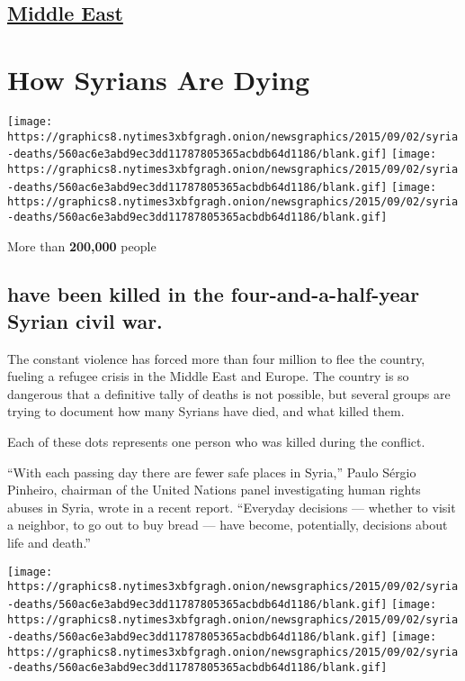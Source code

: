 \hypertarget{-middle-east-}{%
\subsection{\texorpdfstring{ \href{/section/world/middleeast}{Middle
East} }{ Middle East }}\label{-middle-east-}}

\hypertarget{how-syrians-are-dying}{%
\section{How Syrians Are Dying}\label{how-syrians-are-dying}}

\texttt{[image: https://graphics8.nytimes3xbfgragh.onion/newsgraphics/2015/09/02/syria-deaths/560ac6e3abd9ec3dd11787805365acbdb64d1186/blank.gif]}
\texttt{[image: https://graphics8.nytimes3xbfgragh.onion/newsgraphics/2015/09/02/syria-deaths/560ac6e3abd9ec3dd11787805365acbdb64d1186/blank.gif]}
\texttt{[image: https://graphics8.nytimes3xbfgragh.onion/newsgraphics/2015/09/02/syria-deaths/560ac6e3abd9ec3dd11787805365acbdb64d1186/blank.gif]}

More than \textbf{200,000} people

\hypertarget{have-been-killed-in-the-four-and-a-half-year-syrian-civil-war}{%
\subsection{have been killed in the four-and-a-half-year Syrian civil
war.}\label{have-been-killed-in-the-four-and-a-half-year-syrian-civil-war}}

The constant violence has forced more than four million to flee the
country, fueling a refugee crisis in the Middle East and Europe. The
country is so dangerous that a definitive tally of deaths is not
possible, but several groups are trying to document how many Syrians
have died, and what killed them.

Each of these dots represents one person who was killed during the
conflict.

``With each passing day there are fewer safe places in Syria,'' Paulo
Sérgio Pinheiro, chairman of the United Nations panel investigating
human rights abuses in Syria, wrote in a recent report. ``Everyday
decisions --- whether to visit a neighbor, to go out to buy bread ---
have become, potentially, decisions about life and death.''

\texttt{[image: https://graphics8.nytimes3xbfgragh.onion/newsgraphics/2015/09/02/syria-deaths/560ac6e3abd9ec3dd11787805365acbdb64d1186/blank.gif]}
\texttt{[image: https://graphics8.nytimes3xbfgragh.onion/newsgraphics/2015/09/02/syria-deaths/560ac6e3abd9ec3dd11787805365acbdb64d1186/blank.gif]}
\texttt{[image: https://graphics8.nytimes3xbfgragh.onion/newsgraphics/2015/09/02/syria-deaths/560ac6e3abd9ec3dd11787805365acbdb64d1186/blank.gif]}

